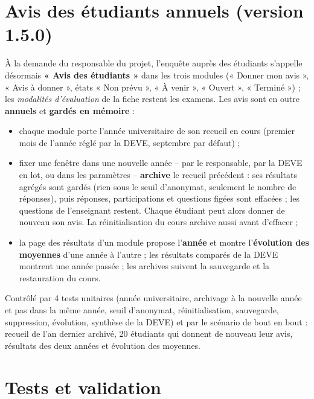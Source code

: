 \documentclass[11pt,a4paper]{article}
\begin{document}
\section{Avis des étudiants annuels (version 1.5.0)}\label{sec:annuel}

À la demande du responsable du projet, l'enquête auprès des étudiants s'appelle désormais
\textbf{« Avis des étudiants »} dans les trois modules (« Donner mon avis », « Avis à donner »,
états « Non prévu », « À venir », « Ouvert », « Terminé ») ; les \emph{modalités d'évaluation}
de la fiche restent les examens. Les avis sont en outre \textbf{annuels} et \textbf{gardés en
mémoire} :
\begin{itemize}
  \item chaque module porte l'année universitaire de son recueil en cours (premier mois de
    l'année réglé par la DEVE, septembre par défaut) ;
  \item fixer une fenêtre dans une nouvelle année -- par le responsable, par la DEVE en lot, ou
    dans les paramètres -- \textbf{archive} le recueil précédent : ses résultats agrégés sont
    gardés (rien sous le seuil d'anonymat, seulement le nombre de réponses), puis réponses,
    participations et questions figées sont effacées ; les questions de l'enseignant restent.
    Chaque étudiant peut alors donner de nouveau son avis. La réinitialisation du cours archive
    aussi avant d'effacer ;
  \item la page des résultats d'un module propose l'\textbf{année} et montre l'\textbf{évolution
    des moyennes} d'une année à l'autre ; les résultats comparés de la DEVE montrent une année
    passée ; les archives suivent la sauvegarde et la restauration du cours.
\end{itemize}
Contrôlé par 4 tests unitaires (année universitaire, archivage à la nouvelle année et pas dans
la même année, seuil d'anonymat, réinitialisation, sauvegarde, suppression, évolution, synthèse
de la DEVE) et par le scénario de bout en bout : recueil de l'an dernier archivé, 20 étudiants
qui donnent de nouveau leur avis, résultats des deux années et évolution des moyennes.

\section{Tests et validation}\label{sec:validation}
\end{document}
